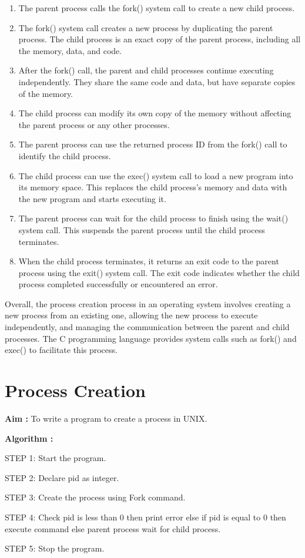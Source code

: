 \documentclass[journal,onecolumn]{IEEEtran}
\begin{document}
\begin{enumerate}
  \item The parent process calls the fork() system call to create a new child process.
  \item The fork() system call creates a new process by duplicating the parent process. The child process is an exact copy of the parent process, including all the memory, data, and code.
  \item After the fork() call, the parent and child processes continue executing independently. They share the same code and data, but have separate copies of the memory.
  \item The child process can modify its own copy of the memory without affecting the parent process or any other processes.
  \item The parent process can use the returned process ID from the fork() call to identify the child process.
  \item The child process can use the exec() system call to load a new program into its memory space. This replaces the child process's memory and data with the new program and starts executing it.
  \item The parent process can wait for the child process to finish using the wait() system call. This suspends the parent process until the child process terminates.
  \item When the child process terminates, it returns an exit code to the parent process using the exit() system call. The exit code indicates whether the child process completed successfully or encountered an error.

\end{enumerate}

Overall, the process creation process in an operating system involves creating a new process from an existing one, allowing the new process to execute independently, and managing the communication between the parent and child processes. The C programming language provides system calls such as fork() and exec() to facilitate this process.


\section{Process Creation}
\textbf{Aim :} To write a program to create a process in UNIX.

\textbf{Algorithm :}
\begin{list}{}{}
  \item STEP 1: Start the program. 
  \item STEP 2: Declare pid as integer.
  \item STEP 3: Create the process using Fork command.
  \item STEP 4: Check pid is less than 0 then print error else if pid is equal to 0 then execute
  command else parent process wait for child process.
  \item STEP 5: Stop the program.
\end{list}
\end{document}
